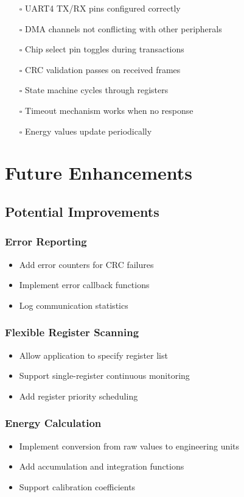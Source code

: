 \documentclass[11pt,a4paper]{article}
\begin{document}
\begin{itemize}
    \item[$\square$] UART4 TX/RX pins configured correctly
    \item[$\square$] DMA channels not conflicting with other peripherals
    \item[$\square$] Chip select pin toggles during transactions
    \item[$\square$] CRC validation passes on received frames
    \item[$\square$] State machine cycles through registers
    \item[$\square$] Timeout mechanism works when no response
    \item[$\square$] Energy values update periodically
\end{itemize}

\section{Future Enhancements}

\subsection{Potential Improvements}

\subsubsection{Error Reporting}
\begin{itemize}[noitemsep]
    \item Add error counters for CRC failures
    \item Implement error callback functions
    \item Log communication statistics
\end{itemize}

\subsubsection{Flexible Register Scanning}
\begin{itemize}[noitemsep]
    \item Allow application to specify register list
    \item Support single-register continuous monitoring
    \item Add register priority scheduling
\end{itemize}

\subsubsection{Energy Calculation}
\begin{itemize}[noitemsep]
    \item Implement conversion from raw values to engineering units
    \item Add accumulation and integration functions
    \item Support calibration coefficients
\end{itemize}
\end{document}
